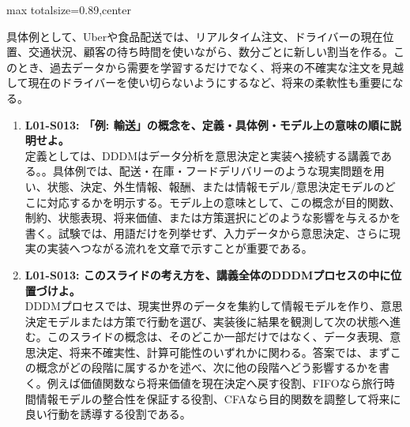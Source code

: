 \begin{minipage}[t]{0.58\textwidth}
\begin{adjustbox}{max totalsize={\textwidth}{0.89\textheight},center}
\begin{minipage}{\textwidth}
具体例として、Uberや食品配送では、リアルタイム注文、ドライバーの現在位置、交通状況、顧客の待ち時間を使いながら、数分ごとに新しい割当を作る。このとき、過去データから需要を学習するだけでなく、将来の不確実な注文を見越して現在のドライバーを使い切らないようにするなど、将来の柔軟性も重要になる。\par{}\begin{enumerate}\item \textbf{L01-S013: 「例: 輸送」の概念を、定義・具体例・モデル上の意味の順に説明せよ。}\\定義としては、DDDMはデータ分析を意思決定と実装へ接続する講義である。。具体例では、配送・在庫・フードデリバリーのような現実問題を用い、状態、決定、外生情報、報酬、または情報モデル/意思決定モデルのどこに対応するかを明示する。モデル上の意味として、この概念が目的関数、制約、状態表現、将来価値、または方策選択にどのような影響を与えるかを書く。試験では、用語だけを列挙せず、入力データから意思決定、さらに現実の実装へつながる流れを文章で示すことが重要である。\item \textbf{L01-S013: このスライドの考え方を、講義全体のDDDMプロセスの中に位置づけよ。}\\DDDMプロセスでは、現実世界のデータを集約して情報モデルを作り、意思決定モデルまたは方策で行動を選び、実装後に結果を観測して次の状態へ進む。このスライドの概念は、そのどこか一部だけではなく、データ表現、意思決定、将来不確実性、計算可能性のいずれかに関わる。答案では、まずこの概念がどの段階に属するかを述べ、次に他の段階へどう影響するかを書く。例えば価値関数なら将来価値を現在決定へ戻す役割、FIFOなら旅行時間情報モデルの整合性を保証する役割、CFAなら目的関数を調整して将来に良い行動を誘導する役割である。\end{enumerate}
\end{minipage}
\end{adjustbox}
\end{minipage}


